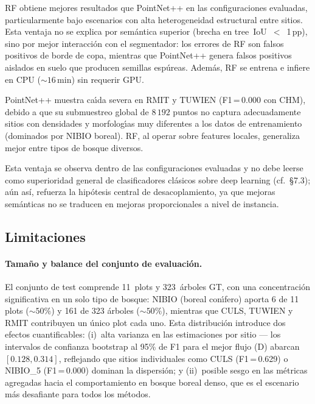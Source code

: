 \documentclass{cys}
\begin{document}
RF obtiene mejores resultados que PointNet++ en las configuraciones evaluadas, particularmente bajo escenarios con alta heterogeneidad estructural entre sitios. Esta ventaja no se explica por sem\'antica superior (brecha en tree~IoU~$<$~1\,pp), sino por mejor interacci\'on con el segmentador: los errores de RF son falsos positivos de borde de copa, mientras que PointNet++ genera falsos positivos aislados en suelo que producen semillas esp\'ureas. Adem\'as, RF se entrena e infiere en CPU (${\sim}16$\,min) sin requerir GPU.

PointNet++ muestra ca\'\i{}da severa en RMIT y TUWIEN (F1\,=\,0.000 con CHM), debido a que su submuestreo global de $8\,192$ puntos no captura adecuadamente sitios con densidades y morfolog\'\i{}as muy diferentes a los datos de entrenamiento (dominados por NIBIO boreal). RF, al operar sobre features locales, generaliza mejor entre tipos de bosque diversos.

Esta ventaja se observa dentro de las configuraciones evaluadas y no debe leerse como superioridad general de clasificadores clásicos sobre deep learning (cf.\ §7.3); aún así, refuerza la hipótesis central de desacoplamiento, ya que mejoras semánticas no se traducen en mejoras proporcionales a nivel de instancia.

\subsection{Limitaciones}

\paragraph{Tama\~no y balance del conjunto de evaluaci\'on.}
El conjunto de test comprende 11~plots y 323~\'arboles GT, con una concentraci\'on significativa en un solo tipo de bosque: NIBIO (boreal con\'\i{}fero) aporta 6 de 11 plots (${\sim}50\%$) y 161 de 323 \'arboles (${\sim}50\%$), mientras que CULS, TUWIEN y RMIT contribuyen un \'unico plot cada uno. Esta distribuci\'on introduce dos efectos cuantificables: (i)~alta varianza en las estimaciones por sitio --- los intervalos de confianza bootstrap al 95\% de F1 para el mejor flujo (D) abarcan $[0.128, 0.314]$, reflejando que sitios individuales como CULS (F1\,=\,0.629) o NIBIO\_5 (F1\,=\,0.000) dominan la dispersi\'on; y (ii)~posible sesgo en las m\'etricas agregadas hacia el comportamiento en bosque boreal denso, que es el escenario m\'as desafiante para todos los m\'etodos.
\end{document}
